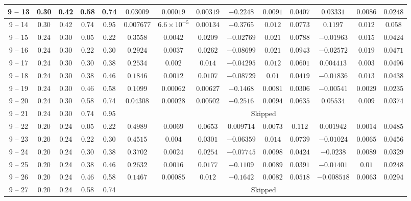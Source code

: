 \begin{longtable}{|*{14}{c|}}
\hline
9 -- 13 & 0.30 & 0.42 & 0.58 & 0.74 & $0.03009$ & $0.00019$ & $0.00319$ & $-0.2248$ & $0.0091$ & $0.0407$ & $0.03331$ & $0.0086$ & $0.0248$ \\
\hline
9 -- 14 & 0.30 & 0.42 & 0.74 & 0.95 & $0.007677$ & $6.6\times 10^{-5}$ & $0.00134$ & $-0.3765$ & $0.012$ & $0.0773$ & $0.1197$ & $0.012$ & $0.058$ \\
\hline
9 -- 15 & 0.24 & 0.30 & 0.05 & 0.22 & $0.3558$ & $0.0042$ & $0.0209$ & $-0.02769$ & $0.021$ & $0.0788$ & $-0.01963$ & $0.015$ & $0.0424$ \\
\hline
9 -- 16 & 0.24 & 0.30 & 0.22 & 0.30 & $0.2924$ & $0.0037$ & $0.0262$ & $-0.08699$ & $0.021$ & $0.0943$ & $-0.02572$ & $0.019$ & $0.0471$ \\
\hline
9 -- 17 & 0.24 & 0.30 & 0.30 & 0.38 & $0.2534$ & $0.002$ & $0.014$ & $-0.04295$ & $0.012$ & $0.0601$ & $0.004413$ & $0.003$ & $0.0496$ \\
\hline
9 -- 18 & 0.24 & 0.30 & 0.38 & 0.46 & $0.1846$ & $0.0012$ & $0.0107$ & $-0.08729$ & $0.01$ & $0.0419$ & $-0.01836$ & $0.013$ & $0.0438$ \\
\hline
9 -- 19 & 0.24 & 0.30 & 0.46 & 0.58 & $0.1099$ & $0.00062$ & $0.00627$ & $-0.1468$ & $0.0081$ & $0.0306$ & $-0.00541$ & $0.0029$ & $0.0235$ \\
\hline
9 -- 20 & 0.24 & 0.30 & 0.58 & 0.74 & $0.04308$ & $0.00028$ & $0.00502$ & $-0.2516$ & $0.0094$ & $0.0635$ & $0.05534$ & $0.009$ & $0.0374$ \\
\hline
9 -- 21 & 0.24 & 0.30 & 0.74 & 0.95 & \multicolumn{9}{c|}{Skipped} \\
\hline
9 -- 22 & 0.20 & 0.24 & 0.05 & 0.22 & $0.4989$ & $0.0069$ & $0.0653$ & $0.009714$ & $0.0073$ & $0.112$ & $0.001942$ & $0.0014$ & $0.0485$ \\
\hline
9 -- 23 & 0.20 & 0.24 & 0.22 & 0.30 & $0.4515$ & $0.004$ & $0.0301$ & $-0.06359$ & $0.014$ & $0.0739$ & $-0.01024$ & $0.0065$ & $0.0456$ \\
\hline
9 -- 24 & 0.20 & 0.24 & 0.30 & 0.38 & $0.3702$ & $0.0024$ & $0.0254$ & $-0.07745$ & $0.0098$ & $0.0424$ & $-0.0238$ & $0.0089$ & $0.0329$ \\
\hline
9 -- 25 & 0.20 & 0.24 & 0.38 & 0.46 & $0.2632$ & $0.0016$ & $0.0177$ & $-0.1109$ & $0.0089$ & $0.0391$ & $-0.01401$ & $0.01$ & $0.0248$ \\
\hline
9 -- 26 & 0.20 & 0.24 & 0.46 & 0.58 & $0.1467$ & $0.00085$ & $0.012$ & $-0.1642$ & $0.0082$ & $0.0518$ & $-0.008518$ & $0.0063$ & $0.0294$ \\
\hline
9 -- 27 & 0.20 & 0.24 & 0.58 & 0.74 & \multicolumn{9}{c|}{Skipped} \\

\end{longtable}
